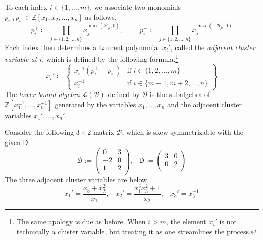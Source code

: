 \documentclass[ALCO,published]{cedram}
\numberwithin{equation}{section}
\newcommand{\B}{\mathcal{B}}
\renewcommand{\L}{\mathcal{L}}%
\newcommand{\1}{^{-1}}
\def\ZZ{\mathbb{Z}}
\def\Q{\mathsf{Q}}
\newcommand{\gmat}[2][ccccccccccccccccccccccccccccccccc]{\left(\begin{array}{#1} #2\\ \end{array}\right)}
\begin{document}
To each index $i\in \{1,\dots,m\}$, we associate two monomials $p_i^+,p_i^-\in \ZZ[x_1,x_2,\dots,x_n]$ as follows.
\begin{equation}
p_i^+ \coloneqq \prod_{j\in \{1,2,\dots,n\}}x_j^{\max(\B_{ji},0)},\hspace{1cm} p_i^- \coloneqq\prod_{j\in \{1,2,\dots,n\}}x_j^{\max(-\B_{ji},0)}
\end{equation}
Each index then determines a Laurent polynomial $x_i'$, called the \textit{adjacent cluster variable at $i$}, which is defined by the following formula.\footnote{The same apology is due as before. When $i>m$, the element $x_i'$ is not technically a cluster variable, but treating it as one streamlines the process.}
\begin{equation}%
x_i' \coloneqq \left\{\begin{array}{cc}
x_i^{-1}(p_i^++p_i^-) & \text{if $i\in \{1,2,\dots, m\}$} \\
x_i^{-1} & \text{if $i\in \{m+1,m+2,\dots,n\}$}
\end{array}\right\}
\end{equation}
The \textit{lower bound algebra} $\L(\B)$ defined by $\B$ is the subalgebra of $\ZZ[x_1^{\pm1},\dots,x_n^{\pm1}]$ generated by the variables $x_1,\dots,x_n$ and the adjacent cluster variables $x_1',\dots,x_n'$.
\begin{ex}
Consider the following $3\times 2$ matrix $\B$, which is skew-symmetrizable with the given $\mathsf{D}$.
\[ \B := \gmat{0 & 3 \\ -2 & 0 \\ 1 & 2},\;\;\; \mathsf{D}:= \gmat{ 3 & 0 \\ 0 & 2} \]
The three adjacent cluster variables are below.
\[ x_1' = \frac{x_3 + x_2^2}{x_1} ,\;\;\; x_2' = \frac{x_1^3x_3^2+1}{x_2},\;\;\; x_3' = x_3^{-1} \]
\end{ex}


\end{document}
